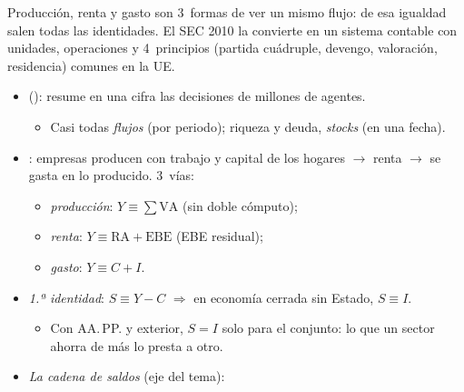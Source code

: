 \documentclass{article}
\begin{document}
\begin{columnas}
\begin{ideaclave}
Producción, renta y gasto son 3~formas de ver un mismo flujo: de esa igualdad salen todas las identidades. El SEC 2010 la convierte en un sistema contable con unidades, operaciones y 4~principios (partida cuádruple, devengo, valoración, residencia) comunes en la UE.
\end{ideaclave}

\begin{itemize}
\item {} (): resume en una cifra las decisiones de millones de agentes.
  \begin{itemize}
  \item Casi todas \emph{flujos} (por periodo); riqueza y deuda, \emph{stocks} (en una fecha).
  \end{itemize}
\item {}: empresas producen con trabajo y capital de los hogares $\to$ renta $\to$ se gasta en lo producido. 3~vías:
  \begin{itemize}
  \item \emph{producción}: $Y\equiv\sum\mathrm{VA}$ (sin doble cómputo);
  \item \emph{renta}: $Y\equiv\mathrm{RA}+\mathrm{EBE}$ (EBE residual);
  \item \emph{gasto}: $Y\equiv C+I$.
  \end{itemize}
\end{itemize}
\begin{itemize}
\item \emph{1.ª identidad}: $S\equiv Y-C$ $\Rightarrow$ en economía cerrada sin Estado, \textbf{$S\equiv I$}.
  \begin{itemize}
  \item Con AA.\,PP. y exterior, $S=I$ solo para el conjunto: lo que un sector ahorra de más lo presta a otro.
  \end{itemize}
\item \emph{La cadena de saldos} (eje del tema):

\end{itemize}
\end{columnas}
\end{document}
